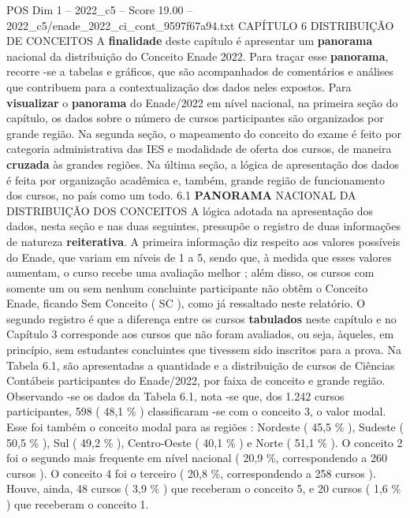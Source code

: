 \begin{textsample}{POS Dim 1 – 2022\_c5 – Score 19.00 – 2022\_c5/enade\_2022\_ci\_cont\_9597f67a94.txt}  \label{ex:f1_pos_027}
CAPÍTULO 6 DISTRIBUIÇÃO DE CONCEITOS A \textbf{finalidade} deste capítulo é apresentar um \textbf{panorama} nacional da distribuição do Conceito Enade 2022.
Para traçar esse \textbf{panorama}, recorre -se a tabelas e gráficos, que são acompanhados de comentários e análises que contribuem para a contextualização dos dados neles expostos.
Para \textbf{visualizar} o \textbf{panorama} do Enade/2022 em nível nacional, na primeira seção do capítulo, os dados sobre o número de cursos participantes são organizados por grande região.
Na segunda seção, o mapeamento do conceito do exame é feito por categoria administrativa das IES e modalidade de oferta dos cursos, de maneira \textbf{cruzada} às grandes regiões.
Na última seção, a lógica de apresentação dos dados é feita por organização acadêmica e, também, grande região de funcionamento dos cursos, no país como um todo. 6.1 \textbf{PANORAMA} NACIONAL DA DISTRIBUIÇÃO DOS CONCEITOS A lógica adotada na apresentação dos dados, nesta seção e nas duas seguintes, pressupõe o registro de duas informações de natureza \textbf{reiterativa}.
A primeira informação diz respeito aos valores possíveis do Enade, que variam em níveis de 1 a 5, sendo que, à medida que esses valores aumentam, o curso recebe uma avaliação melhor ; além disso, os cursos com somente um ou sem nenhum concluinte participante não obtêm o Conceito Enade, ficando Sem Conceito ( SC ), como já ressaltado neste relatório.
O segundo registro é que a diferença entre os cursos \textbf{tabulados} neste capítulo e no Capítulo 3 corresponde aos cursos que não foram avaliados, ou seja, àqueles, em princípio, sem estudantes concluintes que tivessem sido inscritos para a prova.
Na Tabela 6.1, são apresentadas a quantidade e a distribuição de cursos de Ciências Contábeis participantes do Enade/2022, por faixa de conceito e grande região.
Observando -se os dados da Tabela 6.1, nota -se que, dos 1.242 cursos participantes, 598 ( 48,1 \% ) classificaram -se com o conceito 3, o valor modal.
Esse foi também o conceito modal para as regiões : Nordeste ( 45,5 \% ), Sudeste ( 50,5 \% ), Sul ( 49,2 \% ), Centro-Oeste ( 40,1 \% ) e Norte ( 51,1 \% ).
O conceito 2 foi o segundo mais frequente em nível nacional ( 20,9 \%, correspondendo a 260 cursos ).
O conceito 4 foi o terceiro ( 20,8 \%, correspondendo a 258 cursos ).
Houve, ainda, 48 cursos ( 3,9 \% ) que receberam o conceito 5, e 20 cursos ( 1,6 \% ) que receberam o conceito 1.

\end{textsample}
